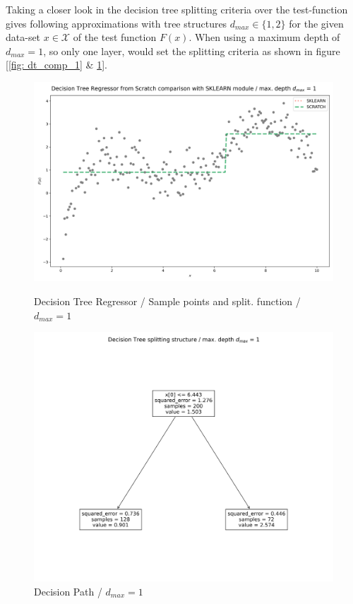 \documentclass[12pt, a4paper]{article}
\begin{document}
Taking a closer look in the decision tree splitting criteria over the test-function gives following approximations with tree structures $d_{max} \in \{1,2\}$ for the given data-set $x \in \mathcal{X}$ of the test function $F(x)$. When using a maximum depth of $d_{max} = 1$, so only one layer, would set the splitting criteria as shown in figure [\ref{fig: dt_comp_1} \& \ref{fig: dt_split_1}].
\begin{figure}[htbp]
\begin{minipage}[t]{7cm}
\vspace{0pt}
\centering
\includegraphics[width=1\textwidth,trim={0 0 0 0},clip]{figures/decision_tree_regressor_comparison_md=1.png}
\caption[Decision Tree Regressor / One Layer]{Decision Tree Regressor / Sample points and split. function / $d_{max} = 1$}
\label{fig: dt_comp_1}  
\end{minipage}
\hfill
\begin{minipage}[t]{6cm}
\vspace{0pt}
\centering
\includegraphics[width=1\textwidth,trim={0 0 0 0},clip]{figures/decision_tree_splitting_structure_md=1.png}
\caption[Decision Path / One Layer]{Decision Path / $d_{max} = 1$}
\label{fig: dt_split_1} 
\end{minipage}
\end{figure}
\end{document}
